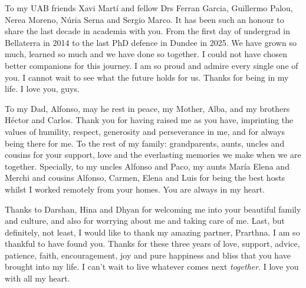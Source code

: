 To my UAB friends Xavi Martí and fellow Drs Ferran Garcia, Guillermo Palou, Nerea Moreno, Núria Serna and Sergio Marco. It has been such an honour to share the last decade in academia with you. From the first day of undergrad in Bellaterra in 2014 to the last PhD defence in Dundee in 2025. We have grown so much, learned so much and we have done so together. I could not have chosen better companions for this journey. I am so proud and admire every single one of you. I cannot wait to see what the future holds for us. Thanks for being in my life. I love you, guys.

To my Dad, Alfonso, may he rest in peace, my Mother, Alba, and my brothers Héctor and Carlos. Thank you for having raised me as you have, imprinting the values of humility, respect, generosity and perseverance in me, and for always being there for me. To the rest of my family: grandparents, aunts, uncles and cousins for your support, love and the everlasting memories we make when we are together. Specially, to my uncles Alfonso and Paco, my aunts María Elena and Merchi and cousins Alfonso, Carmen, Elena and Luis for being the best hosts whilst I worked remotely from your homes. You are always in my heart.

Thanks to Darshan, Hina and Dhyan for welcoming me into your beautiful family and culture, and also for worrying about me and taking care of me. Last, but definitely, not least, I would like to thank my amazing partner, Prarthna. I am so thankful to have found you. Thanks for these three years of love, support, advice, patience, faith, encouragement, joy and pure happiness and bliss that you have brought into my life. I can't wait to live whatever comes next \textit{together}. I love you with all my heart.